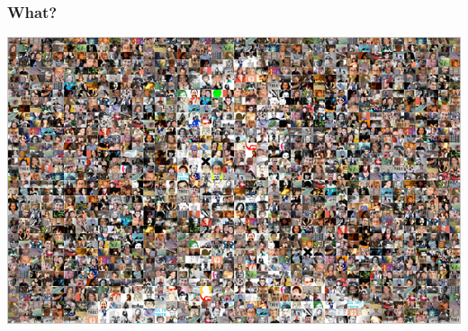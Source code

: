 \documentclass[notheorems,serif,table,compress]{beamer}  %
\begin{document}
  
\begin{frame}
\frametitle{What?}
  \begin{center}
  \includegraphics[width=1\linewidth]{people}
  \end{center}
\end{frame}
\end{document}
